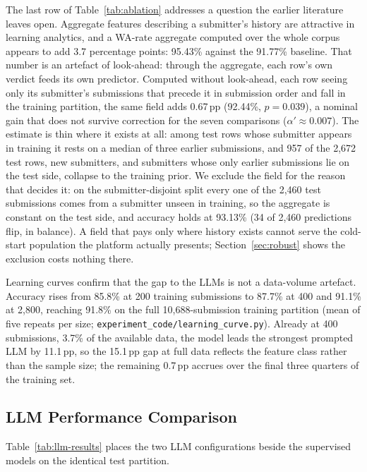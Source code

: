 \documentclass[acmsmall]{acmart}
\begin{document}
The last row of Table~\ref{tab:ablation} addresses a question the earlier
literature leaves open. Aggregate features describing a submitter's history
are attractive in learning analytics, and a WA-rate aggregate computed over
the whole corpus appears to add 3.7 percentage points: 95.43\% against the
91.77\% baseline. That number is an artefact of look-ahead: through the
aggregate, each row's own verdict feeds its own predictor. Computed without
look-ahead, each row seeing only its submitter's submissions that precede it
in submission order and fall in the training partition, the same field adds
0.67\,pp (92.44\%, $p=0.039$), a nominal gain that does not survive
correction for the seven comparisons ($\alpha'\approx0.007$). The estimate is
thin where it exists at all: among test rows whose submitter appears in
training it rests on a median of three earlier submissions, and 957 of the
2,672 test rows, new submitters, and submitters whose only earlier
submissions lie on the test side, collapse to the training prior. We exclude
the field for the reason that decides it: on the submitter-disjoint split
every one of the 2,460 test submissions comes from a submitter unseen in training, so the aggregate is constant on
the test side, and accuracy holds at 93.13\% (34 of 2,460 predictions flip,
in balance). A field that pays only where history exists cannot serve the
cold-start population the platform actually presents; Section~\ref{sec:robust}
shows the exclusion costs nothing there.

Learning curves confirm that the gap to the LLMs is not a data-volume artefact.
Accuracy rises from 85.8\% at 200 training submissions to 87.7\% at 400 and
91.1\% at 2{,}800, reaching 91.8\% on the full 10{,}688-submission training
partition (mean of five repeats per size;
\texttt{experiment\_code/learning\_curve.py}). Already at 400
submissions, 3.7\% of the available data, the model leads the strongest
prompted LLM by 11.1\,pp, so the 15.1\,pp gap at full data reflects the
feature class rather than the sample size; the remaining 0.7\,pp accrues over
the final three quarters of the training set.

\subsection{LLM Performance Comparison}
\label{sec:llm-eval}

Table~\ref{tab:llm-results} places the two LLM configurations beside the
supervised models on the identical test partition.
\end{document}
